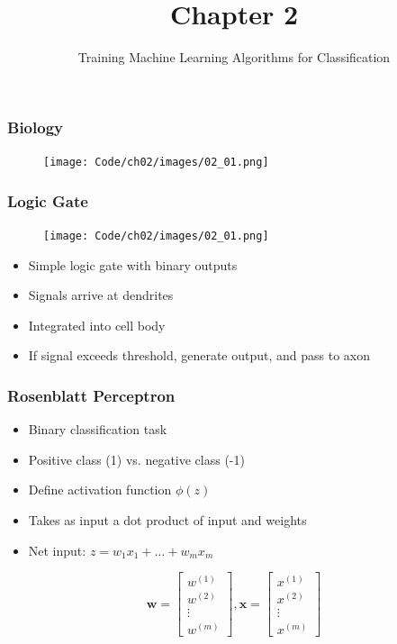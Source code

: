 \documentclass{beamer}
\title{Chapter 2}
\subtitle{Training Machine Learning Algorithms for Classification}
\begin{document}
\maketitle

\begin{frame}
  \frametitle{Biology}
   \begin{center}
    \begin{figure}
      \texttt{[image: Code/ch02/images/02\_01.png]}
    \end{figure}
   \end{center}
\end{frame}

\begin{frame}
  \frametitle{Logic Gate}
  \begin{center}
    \begin{figure}
      \texttt{[image: Code/ch02/images/02\_01.png]}
    \end{figure}
  \end{center}
  \begin{itemize}
  \item Simple logic gate with binary outputs
  \item Signals arrive at dendrites
  \item Integrated into cell body
  \item If signal exceeds threshold, generate output, and pass to axon
  \end{itemize}
\end{frame}

\begin{frame}
  \frametitle{Rosenblatt Perceptron}
  \begin{itemize}
  \item Binary classification task
  \item Positive class (1) vs. negative class (-1)
  \item Define activation function $\phi(z)$
  \item Takes as input a dot product of input and weights
  \item Net input: $z = w_1 x_1 + \dots + w_m x_m$
  \end{itemize}

  \[
  \mathbf{w} = \begin{bmatrix}
    w^{(1)}  \\
    w^{(2)}  \\
    \vdots  \\
    w^{(m)}
  \end{bmatrix},
  \mathbf{x} = \begin{bmatrix}
    x^{(1)}  \\
    x^{(2)}  \\
    \vdots  \\
    x^{(m)}
  \end{bmatrix}
  \]

\end{frame}
\end{document}
